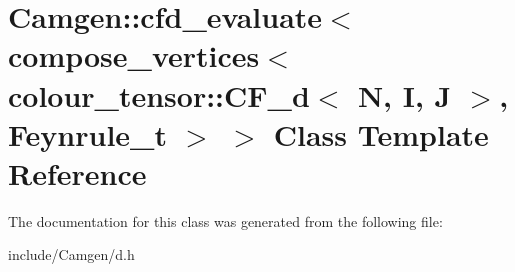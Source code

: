\hypertarget{a00041}{}\section{Camgen\+:\+:cfd\+\_\+evaluate$<$ compose\+\_\+vertices$<$ colour\+\_\+tensor\+:\+:C\+F\+\_\+d$<$ N, I, J $>$, Feynrule\+\_\+t $>$ $>$ Class Template Reference}
\label{a00041}


The documentation for this class was generated from the following file\+:\begin{DoxyCompactItemize}
\item 
include/\+Camgen/d.\+h\end{DoxyCompactItemize}
